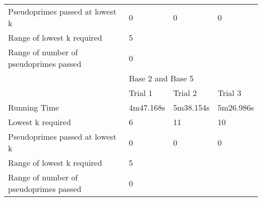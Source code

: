 \documentclass{article}
\begin{document}
\begin{appendices}
\begin{table}[h]
\begin{tabular}{@{}llll@{}}
Pseudoprimes passed at lowest k        & 0           & 0          & 0          \\\cmidrule(lr){2-4}
Range of lowest k required             & \multicolumn{3}{l}{5}                 \\
Range of number of pseudoprimes passed & \multicolumn{3}{l}{0}                 \\\midrule
                                       & \multicolumn{3}{l}{Base 2 and Base 5} \\\midrule
                                       & Trial 1     & Trial 2    & Trial 3    \\
Running Time                           & 4m47.168s   & 5m38.154s  & 5m26.986s  \\
Lowest k required                      & 6           & 11         & 10         \\
Pseudoprimes passed at lowest k        & 0           & 0          & 0          \\\cmidrule(lr){2-4}
Range of lowest k required             & \multicolumn{3}{l}{5}                 \\
Range of number of pseudoprimes passed & \multicolumn{3}{l}{0}                 \\ \bottomrule
\end{tabular}
\end{table}
\FloatBarrier


\end{appendices}
\end{document}
